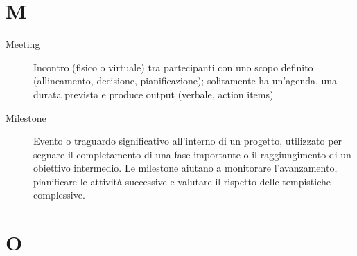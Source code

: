 \section*{M}
\begin{description}
    \item[Meeting] Incontro (fisico o virtuale) tra partecipanti con uno scopo definito (allineamento, decisione, pianificazione); solitamente ha un'agenda, una durata prevista e produce output (verbale, action items).
    \item[Milestone] Evento o traguardo significativo all’interno di un progetto, utilizzato per segnare il completamento di una fase importante o il raggiungimento di un obiettivo intermedio. Le milestone aiutano a monitorare l’avanzamento, pianificare le attività successive e valutare il rispetto delle tempistiche complessive.
\end{description}

\section*{O}

